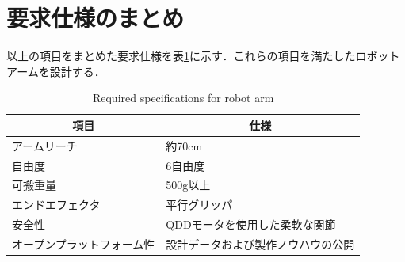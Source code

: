 \section{要求仕様のまとめ}
以上の項目をまとめた要求仕様を表\ref{tab:armSpecs}に示す．これらの項目を満たしたロボットアームを設計する．

\begin{table}
  \centering
  \begin{tabular}{l|l}
    \hline
    \multicolumn{1}{c|}{\textbf{項目}} & \multicolumn{1}{c}{\textbf{仕様}} \\ \hline
    アームリーチ                           & 約70cm                           \\
    自由度                              & 6自由度                            \\
    可搬重量                             & 500g以上                          \\
    エンドエフェクタ                         & 平行グリッパ                          \\
    安全性                              & QDDモータを使用した柔軟な関節                \\
    オープンプラットフォーム性                    & 設計データおよび製作ノウハウの公開               \\ \hline
  \end{tabular}
  \caption{Required specifications for robot arm}
  \label{tab:armSpecs}
\end{table}
\clearpage
\newpage
